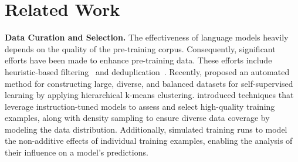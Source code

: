 \section{Related Work}
\label{sec: related}

\textbf{\small Data Curation and Selection.} The effectiveness of language models heavily depends on the quality of the pre-training corpus. Consequently, significant efforts have been made to enhance pre-training data. These efforts include heuristic-based filtering~\citep{raffel2020exploring, rae2021scaling, laurenccon2022bigscience, penedo2023refinedweb, soldaini2024dolma} and deduplication~\citep{abbas2023semdedup, lee2021deduplicating, chowdhery2022palm, dubey2024llama}. Recently, \cite{vo2024automatic} proposed an automated method for constructing large, diverse, and balanced datasets for self-supervised learning by applying hierarchical k-means clustering. \cite{sachdeva2024train} introduced techniques that leverage instruction-tuned models to assess and select high-quality training examples, along with density sampling to ensure diverse data coverage by modeling the data distribution. Additionally, \cite{guu2023simfluence} simulated training runs to model the non-additive effects of individual training examples, enabling the analysis of their influence on a model's predictions.

